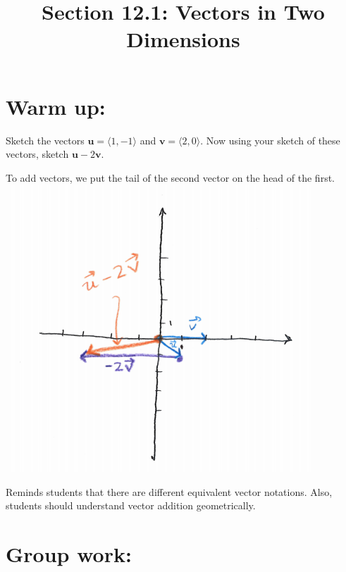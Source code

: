 \documentclass[handout]{ximera}
\title{Section 12.1: Vectors in Two Dimensions}
\begin{document}
\begin{abstract}		\end{abstract}
\maketitle


\section{Warm up:}

\begin{problem}
Sketch the vectors $\mathbf{u}=\langle 1, -1 \rangle$ and $\mathbf{v}=\langle 2, 0 \rangle$. Now using your sketch of these vectors, sketch $\mathbf{u}-2\mathbf{v}$.
	\begin{freeResponse}
	To add vectors, we put the tail of the second vector on the head of the first. 
		\includegraphics[scale=0.5]{Figure12-1-1}
	\end{freeResponse}
	
\begin{instructorNotes}
Reminds students that there are different equivalent vector notations. Also, students should understand vector addition geometrically.
\end{instructorNotes}

\end{problem}







\section{Group work:}
\end{document}
